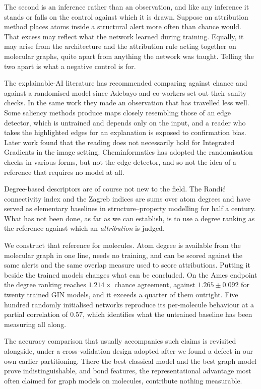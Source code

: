 \documentclass[journal=jcisd8,manuscript=article]{achemso}
\begin{document}
The second is an inference rather than an observation, and like any inference it stands or
falls on the control against which it is drawn. Suppose an attribution method places atoms
inside a structural alert more often than chance would. That excess may reflect what the
network learned during training. Equally, it may arise from the architecture and the
attribution rule acting together on molecular graphs, quite apart from anything the network
was taught. Telling the two apart is what a negative control is for.

The explainable-AI literature has recommended comparing against chance and against a
randomised model since Adebayo and co-workers set out their sanity checks.\cite{adebayo2018}
In the same work they made an observation that has travelled less well. Some saliency methods
produce maps closely resembling those of an edge detector, which is untrained and depends
only on the input, and a reader who takes the highlighted edges for an explanation is exposed
to confirmation bias. Later work found that the reading does not necessarily hold for
Integrated Gradients in the image setting.\cite{kokhlikyan2021} Cheminformatics has adopted the randomisation checks in various
forms,\cite{hartog2024,walter2024} but not the edge detector, and so not the idea of a
reference that requires no model at all.

Degree-based descriptors are of course not new to the field. The Randi\'c connectivity
index\cite{randic1975} and the Zagreb indices\cite{gutman1972} are sums over atom degrees and
have served as elementary baselines in structure--property modelling for half a century. What
has not been done, as far as we can establish, is to use a degree ranking as the reference
against which an \emph{attribution} is judged.

We construct that reference for molecules. Atom degree is available from the molecular graph
in one line, needs no training, and can be scored against the same alerts and the same
overlap measure used to score attributions. Putting it beside the trained models changes what
can be concluded. On the Ames endpoint the degree ranking reaches $1.214\times$ chance
agreement, against $1.265 \pm 0.092$ for twenty trained GIN models, and it exceeds a
quarter of them outright. Five hundred randomly initialised networks reproduce its
per-molecule behaviour at a partial correlation of $0.57$, which identifies what the untrained
baseline has been measuring all along.

The accuracy comparison that usually accompanies such claims is revisited alongside, under a
cross-validation design adopted after we found a defect in our own earlier partitioning.
There the best classical model and the best graph model prove indistinguishable, and bond
features, the representational advantage most often claimed for graph models on molecules,
contribute nothing measurable.
\end{document}
